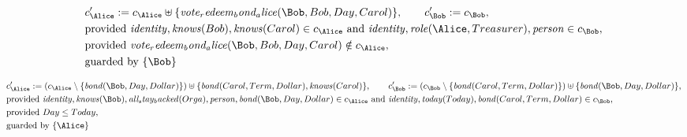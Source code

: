 \begin{align*}
&
c'_
{
\Alice
}
 := 
c_
{
\Alice
}
 \uplus 
\{
\mathit{
vote_redeem_bond_alice
}
(
\Bob
,
Bob
,
Day
,
Carol
)
\}
, \qquad 
c'_
{
\Bob
}
 := 
c_
{
\Bob
}
,\\
&
\text{provided } 
\mathit{
identity
}
,
\mathit{
knows
}
(
Bob
)
,
\mathit{
knows
}
(
Carol
)
 \in c_
{
\Alice
}
 \text{ and } 
\mathit{
identity
}
,
\mathit{
role
}
(
\Alice
,
Treasurer
)
,
\mathit{
person
}
 \in c_
{
\Bob
}
,\\
&
\text{provided } 
\mathit{
vote_redeem_bond_alice
}
(
\Bob
,
Bob
,
Day
,
Carol
)
 \notin c_
{
\Alice
}
,\\
&
\text{guarded by } \{
\Bob
\}
\end{align*}

\begin{align*}
&
c'_
{
\Alice
}
 := 
(c_
{
\Alice
}
 \setminus 
\{
\mathit{
bond
}
(
\Bob
,
Day
,
Dollar
)
\}
) \uplus 
\{
\mathit{
bond
}
(
Carol
,
Term
,
Dollar
)
,
\mathit{
knows
}
(
Carol
)
\}
, \qquad 
c'_
{
\Bob
}
 := 
(c_
{
\Bob
}
 \setminus 
\{
\mathit{
bond
}
(
Carol
,
Term
,
Dollar
)
\}
) \uplus 
\{
\mathit{
bond
}
(
\Bob
,
Day
,
Dollar
)
\}
,\\
&
\text{provided } 
\mathit{
identity
}
,
\mathit{
knows
}
(
\Bob
)
,
\mathit{
all_stay_backed
}
(
Orga
)
,
\mathit{
person
}
,
\mathit{
bond
}
(
\Bob
,
Day
,
Dollar
)
 \in c_
{
\Alice
}
 \text{ and } 
\mathit{
identity
}
,
\mathit{
today
}
(
Today
)
,
\mathit{
bond
}
(
Carol
,
Term
,
Dollar
)
 \in c_
{
\Bob
}
,\\
&
\text{provided } 
Day
\le
Today
,\\
&
\text{guarded by } \{
\Alice
\}
\end{align*}

